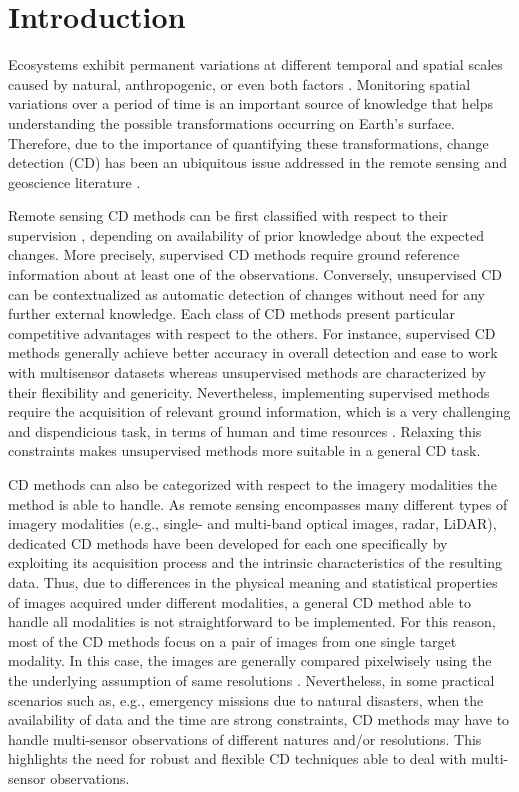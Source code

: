 \documentclass[review]{elsarticle}
\begin{document}
\section{Introduction}

Ecosystems exhibit permanent variations at different temporal and spatial scales caused by natural, anthropogenic, or even both factors \citep{coppin_review_2004}. Monitoring spatial variations over a period of time is an important source of knowledge that helps understanding the possible transformations occurring on Earth's surface. Therefore, due to the importance of quantifying these transformations, change detection (CD) has been an ubiquitous issue addressed in the remote sensing and geoscience literature \citep{lu_change_2004}.

Remote sensing CD methods can be first classified with respect to their supervision \citep{bovolo_theoretical_2007}, depending on availability of prior knowledge about the expected changes. More precisely, supervised CD methods require ground reference information about at least one of the observations. Conversely, unsupervised CD can be contextualized as automatic detection of changes without need for any further external knowledge. Each class of CD methods present particular competitive advantages with respect to the others. For instance, supervised CD methods generally achieve better accuracy in overall detection and ease to work with multisensor datasets whereas unsupervised methods are characterized by their flexibility and genericity. Nevertheless, implementing supervised methods require the acquisition of relevant ground information, which is a very challenging and dispendicious task, in terms of human and time resources \citep{bovolo_theoretical_2007}. Relaxing this constraints makes unsupervised methods more suitable in a general CD task.

CD methods can also be categorized with respect to the imagery modalities the method is able to handle. As remote sensing encompasses many different types of imagery modalities (e.g., single- and multi-band optical images, radar, LiDAR), dedicated CD methods have been developed for each one specifically by exploiting its acquisition process and the intrinsic characteristics of the resulting data. Thus, due to differences in the physical meaning and statistical properties of images acquired under different modalities, a general CD method able to handle all modalities is not straightforward to be implemented. For this reason, most of the CD methods focus on a pair of images from one single target modality. In this case, the images are generally compared pixelwisely using the the underlying assumption of same resolutions \citep{singh_review_1989,bovolo_time_2015}. Nevertheless, in some practical scenarios such as, e.g., emergency missions due to natural disasters, when the availability of data and the time are strong constraints, CD methods may have to handle multi-sensor observations of different natures and/or resolutions. This highlights the need for robust and flexible CD techniques able to deal with multi-sensor observations.
\end{document}
